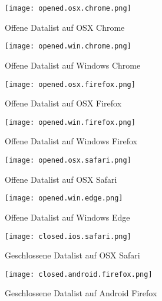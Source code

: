 \begin{figure}[!htb]
    \centering
    \begin{minipage}[b]{0.45\textwidth}
        \centering
        \texttt{[image: opened.osx.chrome.png]}
        \caption{Offene Datalist auf OSX Chrome}
        \label{img:openedOsxChromeDatalist}
    \end{minipage}
    \hfill
    \begin{minipage}[b]{0.45\textwidth}
        \centering
        \texttt{[image: opened.win.chrome.png]}
        \caption{Offene Datalist auf Windows Chrome}
        \label{img:openedWinChromeDatalist}
    \end{minipage}
\end{figure}

\begin{figure}[!htb]
    \centering
    \begin{minipage}[b]{0.45\textwidth}
        \centering
        \texttt{[image: opened.osx.firefox.png]}
        \caption{Offene Datalist auf OSX Firefox}
        \label{img:openedOsxFirefoxDatalist}
    \end{minipage}
    \hfill
    \begin{minipage}[b]{0.45\textwidth}
        \centering
        \texttt{[image: opened.win.firefox.png]}
        \caption{Offene Datalist auf Windows Firefox}
        \label{img:openedWinFirefoxDatalist}
    \end{minipage}
\end{figure}

\begin{figure}[!htb]
    \centering
    \begin{minipage}[b]{0.5\textwidth}
        \centering
        \texttt{[image: opened.osx.safari.png]}
        \caption{Offene Datalist auf OSX Safari}
        \label{img:openedOsxSafariDatalist}
    \end{minipage}
    \hfill
    \begin{minipage}[b]{0.45\textwidth}
        \centering
        \texttt{[image: opened.win.edge.png]}
        \caption{Offene Datalist auf Windows Edge}
        \label{img:openedWinEdgeDatalist}
    \end{minipage}
\end{figure}


\begin{figure}[!htb]
    \centering
    \begin{minipage}[b]{0.45\textwidth}
        \centering
        \texttt{[image: closed.ios.safari.png]}
        \caption{Geschlossene Datalist auf OSX Safari}
        \label{img:closedIosSafariDatalist}
    \end{minipage}
    \hfill
    \begin{minipage}[b]{0.45\textwidth}
        \centering
        \texttt{[image: closed.android.firefox.png]}
        \caption{Geschlossene Datalist auf Android Firefox}
        \label{img:closedAndroidFirefoxDatalist}
    \end{minipage}
\end{figure}

